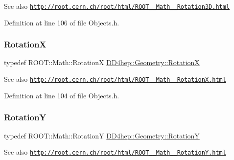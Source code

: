 \begin{DoxySeeAlso}{See also}
\href{http://root.cern.ch/root/html/ROOT__Math__Rotation3D.html}{\tt http\+://root.\+cern.\+ch/root/html/\+R\+O\+O\+T\+\_\+\+\_\+\+Math\+\_\+\+\_\+\+Rotation3\+D.\+html} 
\end{DoxySeeAlso}


Definition at line 106 of file Objects.\+h.

\hypertarget{namespace_d_d4hep_1_1_geometry_a42f6ad69a030aba78a706e72c7ef220e}{}\label{namespace_d_d4hep_1_1_geometry_a42f6ad69a030aba78a706e72c7ef220e} 
\subsubsection{\texorpdfstring{RotationX}{RotationX}}
{\footnotesize\ttfamily typedef R\+O\+O\+T\+::\+Math\+::\+RotationX \hyperlink{namespace_d_d4hep_1_1_geometry_a42f6ad69a030aba78a706e72c7ef220e}{D\+D4hep\+::\+Geometry\+::\+RotationX}}

\begin{DoxySeeAlso}{See also}
\href{http://root.cern.ch/root/html/ROOT__Math__RotationX.html}{\tt http\+://root.\+cern.\+ch/root/html/\+R\+O\+O\+T\+\_\+\+\_\+\+Math\+\_\+\+\_\+\+Rotation\+X.\+html} 
\end{DoxySeeAlso}


Definition at line 104 of file Objects.\+h.

\hypertarget{namespace_d_d4hep_1_1_geometry_a452190ab96c581a3e59793c7ae11e3f1}{}\label{namespace_d_d4hep_1_1_geometry_a452190ab96c581a3e59793c7ae11e3f1} 
\subsubsection{\texorpdfstring{RotationY}{RotationY}}
{\footnotesize\ttfamily typedef R\+O\+O\+T\+::\+Math\+::\+RotationY \hyperlink{namespace_d_d4hep_1_1_geometry_a452190ab96c581a3e59793c7ae11e3f1}{D\+D4hep\+::\+Geometry\+::\+RotationY}}

\begin{DoxySeeAlso}{See also}
\href{http://root.cern.ch/root/html/ROOT__Math__RotationY.html}{\tt http\+://root.\+cern.\+ch/root/html/\+R\+O\+O\+T\+\_\+\+\_\+\+Math\+\_\+\+\_\+\+Rotation\+Y.\+html} 
\end{DoxySeeAlso}


